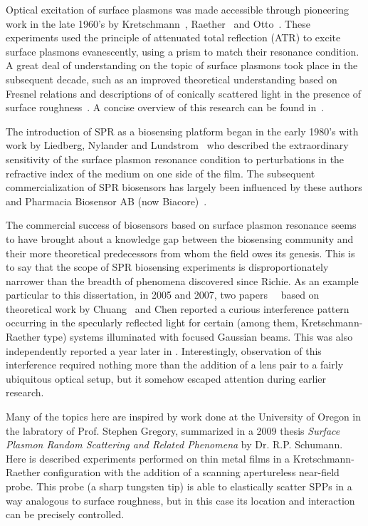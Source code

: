 \documentclass[a4paper,titlepage,onecolumn]{report}
\begin{document}
Optical excitation of surface plasmons was made accessible through
pioneering work in the late 1960's by Kretschmann~\cite{kretschmann1968},
Raether~\cite{raether1965springer} and Otto~\cite{otto1968excitation}.
These experiments used the principle of attenuated total reflection (ATR)
to excite surface plasmons evanescently, using a prism to match their
resonance condition.  A great deal of understanding on the topic of surface
plasmons took place in the subsequent decade, such as an improved
theoretical understanding based on Fresnel relations
\cite{chen1976excitation} and descriptions of of conically scattered light
in the presence of surface roughness~\cite{simon1976directional}.  A
concise overview of this research can be found in~\cite{raether1997surface}.

The introduction of SPR as a biosensing platform began in the early 1980's
with work by Liedberg, Nylander and Lundstrom~\cite{liedberg1983surface}
who described the extraordinary sensitivity of the surface plasmon
resonance condition to perturbations in the refractive index of the medium
on one side of the film.  The subsequent commercialization of SPR
biosensors has largely been influenced by these authors and Pharmacia
Biosensor AB (now Biacore)~\cite{liedberg1995biosensing}.

The commercial success of biosensors based on surface plasmon resonance
seems to have brought about a knowledge gap between the biosensing
community and their more theoretical predecessors from whom the field owes
its genesis.  This is to say that the scope of SPR biosensing experiments
is disproportionately narrower than the breadth of phenomena discovered
since Richie.  As an example particular to this dissertation, in 2005 and
2007, two papers~\cite{andaloro2005optical}~\cite{simon2007observation}
based on theoretical work by Chuang~\cite{chuang1986lateral} and Chen
\cite{chen1976excitation} reported a curious interference pattern occurring
in the specularly reflected light for certain (among them,
Kretschmann-Raether type) systems illuminated with focused Gaussian beams.
This was also independently reported a year later in
\cite{schumann2008near}.  Interestingly, observation of this interference
required nothing more than the addition of a lens pair to a fairly
ubiquitous optical setup, but it somehow escaped attention during earlier
research.  

Many of the topics here are inspired by work done at the University of
Oregon in the labratory of Prof. Stephen Gregory, summarized in a 2009 thesis
{\it Surface Plasmon Random Scattering and Related Phenomena}
\cite{schumann2009surface} by Dr. R.P. Schumann.  Here is described experiments
performed on thin metal films in a Kretschmann-Raether configuration with
the addition of a scanning apertureless near-field probe.  This probe (a
sharp tungsten tip) is able to elastically scatter SPPs in a way analogous
to surface roughness, but in this case its location and interaction can be
precisely controlled.  
\end{document}
